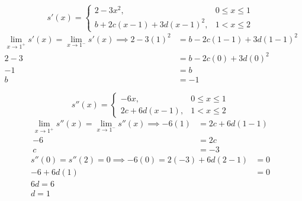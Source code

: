 \documentclass[12pt,twoside]{amsart}
\begin{document}
\begin{enumerate}
    $$s'(x) = \begin{cases}2 - 3x^2, & 0 \leq x \leq 1 \\ b + 2c(x - 1) + 3d(x - 1)^2, & 1 < x \leq 2\end{cases}$$
    \begin{align*}
        \underset{x \rightarrow 1^+}\lim{s'(x)} = \underset{x \rightarrow 1^-}\lim{s'(x)} \implies 2 - 3(1)^2 & = b - 2c(1 - 1) + 3d(1 - 1)^2 \\
        2 - 3 & = b - 2c(0) + 3d(0)^2 \\
        -1 & = b \\
        b & = -1
    \end{align*}

    $$s''(x) = \begin{cases}-6x, & 0 \leq x \leq 1 \\ 2c + 6d(x - 1), & 1 < x \leq 2\end{cases}$$
    \begin{align*}
        \underset{x \rightarrow 1^+}\lim{s''(x)} = \underset{x \rightarrow 1^-}\lim{s''(x)} \implies -6(1) & = 2c + 6d(1 - 1) \\
        -6 & = 2c \\
        c & = -3
    \end{align*}
    \begin{align*}
        s''(0) = s''(2) = 0 \implies -6(0) = 2(-3) + 6d(2 - 1) & = 0 \\
        -6 + 6d(1) & = 0 \\
        6d = 6 \\
        d = 1
    \end{align*}
    \bigskip


\end{enumerate}
\end{document}
